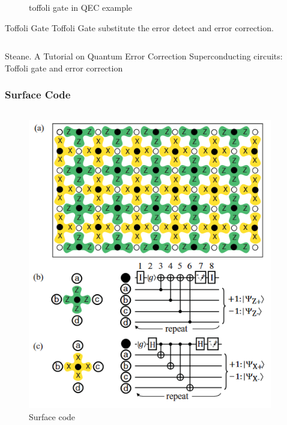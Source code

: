 \documentclass[aspectratio=169,10pt]{beamer}
\begin{document}
\begin{frame}
\begin{columns}
\begin{column}{0.5\textwidth}
\begin{figure}
            \caption{toffoli gate in QEC example}
        \end{figure}
        \begin{block}{Toffoli Gate}
            Toffoli Gate substitute the error detect and error correction.    
        \end{block}
        \end{column}
    \end{columns}
\tiny{Steane. A Tutorial on Quantum Error Correction}
\tiny{Superconducting circuits: Toffoli gate and error correction}
\end{frame}
\begin{frame}
    \frametitle{Surface Code}
    \begin{columns}
        \begin{column}{0.38\textwidth}
            \begin{figure}
                \includegraphics[width=\columnwidth]{figure/surfacecode.png}
                \caption{Surface code}
            \end{figure}
        \end{column}
        \begin{column}{0.6\textwidth}

\end{column}
\end{columns}
\end{frame}
\end{document}
